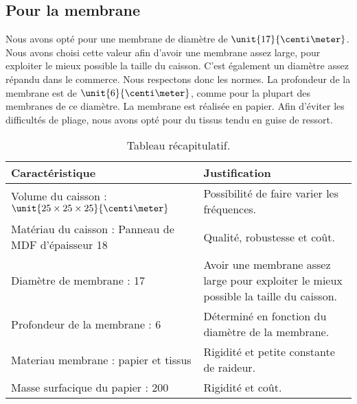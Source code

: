\subsection{Pour la membrane}
Nous avons opté pour une membrane de diamètre de $\unit{17}{\centi\meter}$. Nous avons choisi cette valeur afin 
d'avoir une membrane assez large, pour exploiter le mieux possible la taille du caisson. C'est également un
diamètre assez répandu dans le commerce\cite{tlhp}. Nous respectons donc les normes.
La profondeur de la membrane est de $\unit{6}{\centi\meter}$, comme pour la plupart des membranes de ce
diamètre\cite{tlhp}. La membrane est réalisée en papier. Afin d'éviter les difficultés de pliage, nous avons opté pour
du tissus tendu en guise de ressort. 

\begin{table}[!htb]
	\centering
	\begin{tabularx}{\textwidth}{|X|X|}
		\hline
			 \textbf{Caractéristique} & \textbf{Justification} \\
		\hline
			Volume du caisson : $\unit{25\times25\times25}{\centi\meter}$ & Possibilité de faire varier les fréquences.  \\
		\hline
			Matériau du caisson : Panneau de 	MDF
			d'épaisseur \unit{18}{\milli\meter} & Qualité, robustesse et coût. \\
		\hline
			Diamètre de membrane : \unit{17}{\centi\meter} & Avoir une membrane assez large pour exploiter le mieux possible la taille du caisson. \\
		\hline
			Profondeur de la membrane : \unit{6}{\centi\meter} & Déterminé en fonction du diamètre de la membrane. \\
		\hline
			Materiau membrane : papier et tissus & Rigidité et petite constante de raideur. \\
		\hline
			Masse surfacique du papier : \unit{200}{\gram\per\meter\squared} & Rigidité et coût. \\
		\hline
	\end{tabularx}
	\caption{Tableau récapitulatif.}
\end{table}

